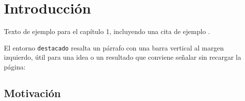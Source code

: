 \documentclass[../main.tex]{subfiles}
\begin{document}
\chapter{Introducción}
\draftwatermarkon


\ifSubfilesClassLoaded{%
	\begin{refsection}%
}{}%

Texto de ejemplo para el capítulo 1, incluyendo una cita de ejemplo \cite{latexcompanion}.

\lipsum[1-2]

El entorno \texttt{destacado} resalta un párrafo con una barra vertical al margen
izquierdo, útil para una idea o un resultado que conviene señalar sin recargar la página:

\begin{destacado}
\lipsum[3][1-4]
\end{destacado}

\lipsum[4-14]

\section{Motivación}

\ifSubfilesClassLoaded{%
	\printbibliography[title={Bibliografía del Capítulo}]%
	\end{refsection}%
}{}%
\end{document}
